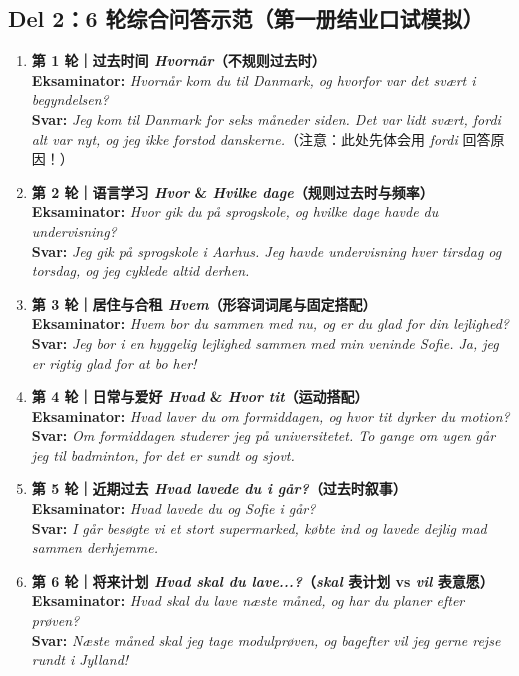 \subsection*{Del 2：6 轮综合问答示范（第一册结业口试模拟）}

\begin{enumerate}
  \item \textbf{\color{NCDRed}第 1 轮｜过去时间 \textit{Hvornår}（不规则过去时）}\\
    \textbf{Eksaminator:} \textit{Hvornår kom du til Danmark, og hvorfor var det svært i begyndelsen?}\\
    \textbf{Svar:} \textit{Jeg kom til Danmark for seks måneder siden. Det var lidt svært, fordi alt var nyt, og jeg ikke forstod danskerne.}（注意：此处先体会用 \textit{fordi} 回答原因！）

  \item \textbf{\color{NCDRed}第 2 轮｜语言学习 \textit{Hvor} \& \textit{Hvilke dage}（规则过去时与频率）}\\
    \textbf{Eksaminator:} \textit{Hvor gik du på sprogskole, og hvilke dage havde du undervisning?}\\
    \textbf{Svar:} \textit{Jeg gik på sprogskole i Aarhus. Jeg havde undervisning hver tirsdag og torsdag, og jeg cyklede altid derhen.}

  \item \textbf{\color{NCDRed}第 3 轮｜居住与合租 \textit{Hvem}（形容词词尾与固定搭配）}\\
    \textbf{Eksaminator:} \textit{Hvem bor du sammen med nu, og er du glad for din lejlighed?}\\
    \textbf{Svar:} \textit{Jeg bor i en hyggelig lejlighed sammen med min veninde Sofie. Ja, jeg er rigtig glad for at bo her!}

  \item \textbf{\color{NCDRed}第 4 轮｜日常与爱好 \textit{Hvad} \& \textit{Hvor tit}（运动搭配）}\\
    \textbf{Eksaminator:} \textit{Hvad laver du om formiddagen, og hvor tit dyrker du motion?}\\
    \textbf{Svar:} \textit{Om formiddagen studerer jeg på universitetet. To gange om ugen går jeg til badminton, for det er sundt og sjovt.}

  \item \textbf{\color{NCDRed}第 5 轮｜近期过去 \textit{Hvad lavede du i går?}（过去时叙事）}\\
    \textbf{Eksaminator:} \textit{Hvad lavede du og Sofie i går?}\\
    \textbf{Svar:} \textit{I går besøgte vi et stort supermarked, købte ind og lavede dejlig mad sammen derhjemme.}

  \item \textbf{\color{NCDRed}第 6 轮｜将来计划 \textit{Hvad skal du lave...?}（\textit{skal} 表计划 vs \textit{vil} 表意愿）}\\
    \textbf{Eksaminator:} \textit{Hvad skal du lave næste måned, og har du planer efter prøven?}\\
    \textbf{Svar:} \textit{Næste måned skal jeg tage modulprøven, og bagefter vil jeg gerne rejse rundt i Jylland!}
\end{enumerate}

